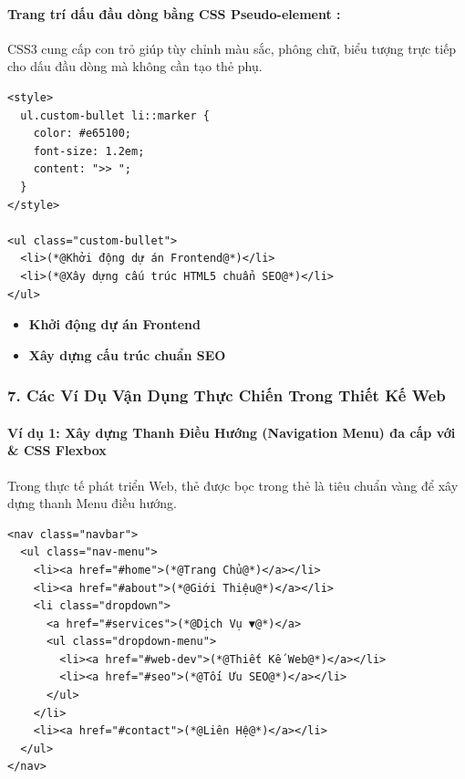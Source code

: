 \paragraph{Trang trí dấu đầu dòng bằng CSS Pseudo-element :}
CSS3 cung cấp con trỏ  giúp tùy chỉnh màu sắc, phông chữ, biểu tượng trực tiếp cho dấu đầu dòng mà không cần tạo thẻ phụ.

\begin{codeWindow}
\begin{lstlisting}[language=HTML5]
<style>
  ul.custom-bullet li::marker {
    color: #e65100;
    font-size: 1.2em;
    content: ">> ";
  }
</style>

<ul class="custom-bullet">
  <li>(*@Khởi động dự án Frontend@*)</li>
  <li>(*@Xây dựng cấu trúc HTML5 chuẩn SEO@*)</li>
</ul>
\end{lstlisting}
\end{codeWindow}

\begin{browserWindow}
\begin{itemize}[label=\textcolor{accentOrange}{\textbf{>>}}, leftmargin=1.8em, itemsep=4pt, parsep=0pt]
    \item \textbf{Khởi động dự án Frontend} \quad{}
    \item \textbf{Xây dựng cấu trúc chuẩn SEO} \quad{}
\end{itemize}
\end{browserWindow}

\subsubsection{7. Các Ví Dụ Vận Dụng Thực Chiến Trong Thiết Kế Web}

\paragraph{Ví dụ 1: Xây dựng Thanh Điều Hướng (Navigation Menu) đa cấp với  \& CSS Flexbox}
Trong thực tế phát triển Web, thẻ  được bọc trong thẻ  là tiêu chuẩn vàng để xây dựng thanh Menu điều hướng.

\begin{codeWindow}
\begin{lstlisting}[language=HTML5]
<nav class="navbar">
  <ul class="nav-menu">
    <li><a href="#home">(*@Trang Chủ@*)</a></li>
    <li><a href="#about">(*@Giới Thiệu@*)</a></li>
    <li class="dropdown">
      <a href="#services">(*@Dịch Vụ ▼@*)</a>
      <ul class="dropdown-menu">
        <li><a href="#web-dev">(*@Thiết Kế Web@*)</a></li>
        <li><a href="#seo">(*@Tối Ưu SEO@*)</a></li>
      </ul>
    </li>
    <li><a href="#contact">(*@Liên Hệ@*)</a></li>
  </ul>
</nav>
\end{lstlisting}
\end{codeWindow}

